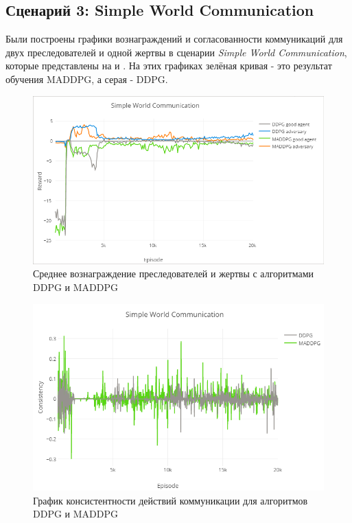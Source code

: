\subsection{Сценарий 3: Simple World Communication} \label{exp-results-svc}

Были построены графики вознаграждений и согласованности коммуникаций для двух преследователей и одной жертвы в сценарии \textit{Simple World Communication}, которые представлены на  и . На этих графиках зелёная кривая - это результат обучения MADDPG, а серая - DDPG.

\begin{figure}[ht!]
    \center
    \includegraphics [scale=0.6] {my_folder/images/ch5/swc-rew.png}
    \caption{Среднее вознаграждение преследователей и жертвы с алгоритмами DDPG и MADDPG}
    \label{fig:result-swc-rew}
\end{figure}

\begin{figure}[ht!]
    \center
    \includegraphics [scale=0.6] {my_folder/images/ch5/swc-comm.png}
    \caption{График консистентности действий коммуникации для алгоритмов DDPG и MADDPG}
    \label{fig:result-swc-comm}
\end{figure}

